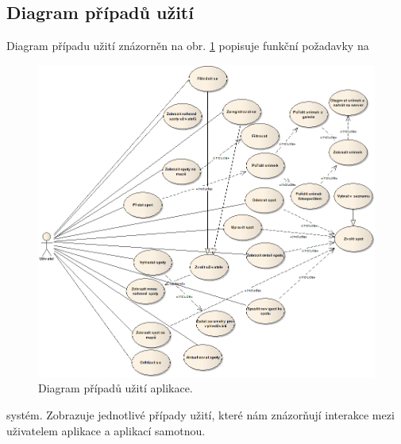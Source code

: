 \documentclass[12pt]{article}
\begin{document}
\subsection{Diagram případů užití}
Diagram případu užití znázorněn na obr. \ref{diagram} popisuje funkční požadavky na
\begin{figure}[ht]
\centerline{\includegraphics[scale=0.5]{images/spotting-diagram.png}}
\caption{Diagram případů užití aplikace.} \label{diagram}
\end{figure}
systém. Zobrazuje jednotlivé případy užití, které nám znázorňují interakce mezi uživatelem  aplikace a aplikací samotnou.
\end{document}
